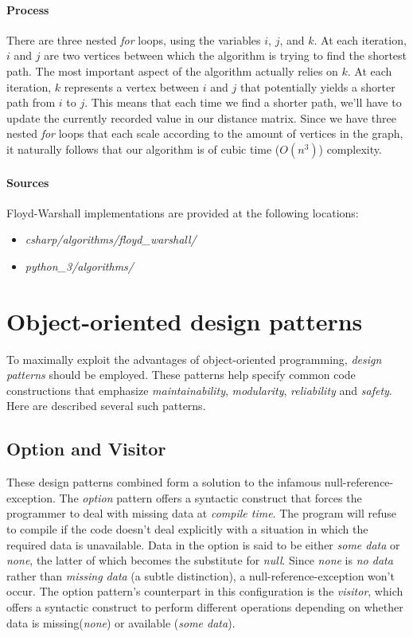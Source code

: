 \documentclass{article}
\begin{document}
\paragraph{Process}
There are three nested {\em for} loops, using the variables \(i\), \(j\), and \(k\). At each iteration,
\(i\) and \(j\) are two vertices between which the algorithm is trying to find the shortest path. The most important
aspect of the algorithm actually relies on \(k\). At each iteration, \(k\) represents a vertex between \(i\) and
\(j\) that potentially yields a shorter path from \(i\) to \(j\). This means that each time we find a shorter path,
we'll have to update the currently recorded value in our distance matrix. Since we have three nested {\em for} loops
that each scale according to the amount of vertices in the graph, it naturally follows that our algorithm is of
cubic time (\(O(n^3)\)) complexity.

\begin{samepage}
  \paragraph{Sources}
  Floyd-Warshall implementations are provided at the following locations:
  \begin{itemize}
  \item{{\em csharp/algorithms/floyd\_warshall/}}
  \item{{\em python\_3/algorithms/}}
  \end{itemize}
\end{samepage}


\newpage


\section{Object-oriented design patterns}
To maximally exploit the advantages of object-oriented programming, {\em design patterns} should be employed. These patterns
help specify common code constructions that emphasize {\em maintainability}, {\em modularity}, {\em reliability} and
{\em safety}. Here are described several such patterns.

\subsection{Option and Visitor}
These design patterns combined form a solution to the infamous null-reference-exception. The {\em option} pattern offers a
syntactic construct that forces the programmer to deal with missing data at {\em compile time}. The program will refuse to
compile if the code doesn't deal explicitly with a situation in which the required data is unavailable. Data in the option
is said to be either {\em some data} or {\em none}, the latter of which becomes the substitute for {\em null}. Since {\em none}
is {\em no data} rather than {\em missing data} (a subtle distinction), a null-reference-exception won't occur. The option
pattern's counterpart in this configuration is the {\em visitor}, which offers a syntactic construct to perform different
operations depending on whether data is missing({\em none}) or available ({\em some data}).
\end{document}
